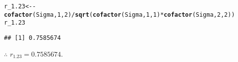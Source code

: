 \documentclass[11pt, a4paper]{article}\usepackage[]{graphicx}\usepackage[]{xcolor}
\makeatletter
\newcommand{\hlnum}[1]{\textcolor[rgb]{0.686,0.059,0.569}{#1}}%
\newcommand{\hlopt}[1]{\textcolor[rgb]{0,0,0}{#1}}%
\newcommand{\hldef}[1]{\textcolor[rgb]{0.345,0.345,0.345}{#1}}%
\newcommand{\hlkwb}[1]{\textcolor[rgb]{0.69,0.353,0.396}{#1}}%
\newcommand{\hlkwd}[1]{\textcolor[rgb]{0.737,0.353,0.396}{\textbf{#1}}}%
\newenvironment{kframe}{%
 \def\at@end@of@kframe{}%
 \ifinner\ifhmode%
  \def\at@end@of@kframe{\end{minipage}}%
  \begin{minipage}{\columnwidth}%
 \fi\fi%
 \def\FrameCommand##1{\hskip\@totalleftmargin \hskip-\fboxsep
 \colorbox{shadecolor}{##1}\hskip-\fboxsep
     \hskip-\linewidth \hskip-\@totalleftmargin \hskip\columnwidth}%
 \MakeFramed {\advance\hsize-\width
   \@totalleftmargin\z@ \linewidth\hsize
   \@setminipage}}%
 {\par\unskip\endMakeFramed%
 \at@end@of@kframe}
\newenvironment{knitrout}{}{} %
\makeatother
\begin{document}
\begin{knitrout}
\color{fgcolor}\begin{kframe}
\begin{alltt}
\hldef{r_1.23} \hlkwb{<-} \hlopt{-} \hlkwd{cofactor}\hldef{(Sigma,} \hlnum{1}\hldef{,} \hlnum{2}\hldef{)} \hlopt{/} \hlkwd{sqrt}\hldef{(}\hlkwd{cofactor}\hldef{(Sigma,} \hlnum{1}\hldef{,} \hlnum{1}\hldef{)} \hlopt{*} \hlkwd{cofactor}\hldef{(Sigma,} \hlnum{2}\hldef{,} \hlnum{2}\hldef{))}
\hldef{r_1.23}
\end{alltt}
\begin{verbatim}
## [1] 0.7585674
\end{verbatim}
\end{kframe}
\end{knitrout}

$\therefore$ $r_{1.23} = 0.7585674$.
\end{document}

